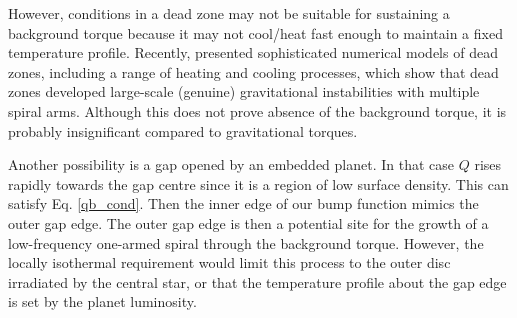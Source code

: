 {  However, conditions in a dead zone may not be suitable for 
  sustaining a background torque because it may not cool/heat fast enough
  to maintain a fixed temperature profile. Recently, 
  \cite{bae14} presented sophisticated numerical models of
  dead zones, including a range of heating and 
  cooling processes, which show that dead zones developed large-scale
  (genuine) gravitational instabilities with multiple spiral
  arms. Although this does not prove absence of the background torque,
  it is probably insignificant compared to gravitational torques. 

  Another possibility is a gap opened by an embedded planet. In that case $Q$
  rises rapidly towards the gap centre since it is a region of low
  surface density. This can satisfy Eq. \ref{qb_cond}. Then the inner
  edge of our bump function mimics the outer gap edge. The outer gap
  edge is then a potential site for the growth of a low-frequency
  one-armed spiral through the background torque. However, the
  locally isothermal requirement would limit this process to the
  outer disc irradiated by the central star, or that the temperature
  profile about the gap edge is set by the planet luminosity.  
}


